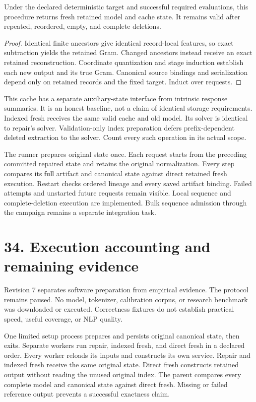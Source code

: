 \begin{theorem}
Under the declared deterministic target and successful required evaluations, this procedure returns fresh retained model and cache state.
It remains valid after repeated, reordered, empty, and complete deletions.
\end{theorem}
\begin{proof}
Identical finite ancestors give identical record-local features, so exact subtraction yields the retained Gram.
Changed ancestors instead receive an exact retained reconstruction.
Coordinate quantization and stage induction establish each new output and its true Gram.
Canonical source bindings and serialization depend only on retained records and the fixed target.
Induct over requests.
\end{proof}

This cache has a separate auxiliary-state interface from intrinsic response summaries.
It is an honest baseline, not a claim of identical storage requirements.
Indexed fresh receives the same valid cache and old model.
Its solver is identical to repair's solver.
Validation-only index preparation defers prefix-dependent deleted extraction to the solver.
Count every such operation in its actual scope.

The runner prepares original state once.
Each request starts from the preceding committed repaired state and retains the original normalization.
Every step compares its full artifact and canonical state against direct retained fresh execution.
Restart checks ordered lineage and every saved artifact binding.
Failed attempts and unstarted future requests remain visible.
Local sequence and complete-deletion execution are implemented.
Bulk sequence admission through the campaign remains a separate integration task.

\newpage
\section*{34. Execution accounting and remaining evidence}
Revision 7 separates software preparation from empirical evidence.
The protocol remains paused.
No model, tokenizer, calibration corpus, or research benchmark was downloaded or executed.
Correctness fixtures do not establish practical speed, useful coverage, or NLP quality.

One limited setup process prepares and persists original canonical state, then exits.
Separate workers run repair, indexed fresh, and direct fresh in a declared order.
Every worker reloads its inputs and constructs its own service.
Repair and indexed fresh receive the same original state.
Direct fresh constructs retained output without reading the unused original index.
The parent compares every complete model and canonical state against direct fresh.
Missing or failed reference output prevents a successful exactness claim.

